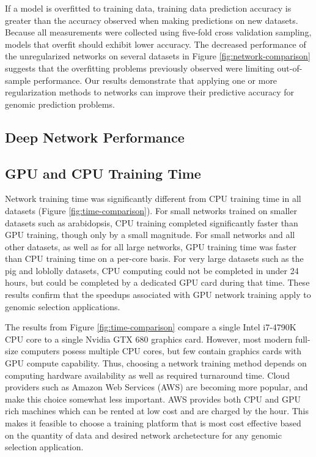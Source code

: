 If a model is overfitted to training data, training data prediction accuracy is greater than 
the accuracy observed when making predictions on new datasets. Because all measurements were collected 
using five-fold cross validation sampling, models that overfit should exhibit lower accuracy. 
The decreased performance of the unregularized networks on several datasets in Figure 
\ref{fig:network-comparison} suggests that the overfitting problems 
previously observed were limiting out-of-sample performance. Our results demonstrate that 
applying one or more regularization methods to networks can improve their 
predictive accuracy for genomic prediction problems.

\ifdefined\showtablesandfigures
\fi

\subsection*{Deep Network Performance}

\ifdefined\showtablesandfigures
\fi

\subsection*{GPU and CPU Training Time}

Network training time was significantly different from CPU training time in all datasets (Figure \ref{fig:time-comparison}).
For small networks trained on smaller datasets such as arabidopsis, CPU training completed significantly faster than GPU training, though only
by a small magnitude. For small networks and all other datasets, as well as for all large networks, GPU training time was faster than 
CPU training time on a per-core basis. For very large datasets such as the pig and loblolly datasets, CPU computing could not be 
completed in under 24 hours, but could be completed by a dedicated GPU card during that time. These results confirm that the 
speedups associated with GPU network training apply to genomic selection applications.  

The results from Figure \ref{fig:time-comparison} compare a single Intel i7-4790K CPU core to a single Nvidia GTX 680 graphics card.
However, most modern full-size computers posess multiple CPU cores, but few contain graphics cards with GPU compute capability. 
Thus, choosing a network training method depends on computing hardware availability as well as required turnaround time. Cloud providers such 
as Amazon Web Services (AWS) are becoming more popular, and make this choice somewhat less important. AWS provides both CPU and GPU rich 
machines which can be rented at low cost and are charged by the hour. This makes it feasible to choose a training platform 
that is most cost effective based on the quantity of data and desired network archetecture for any genomic selection application.


